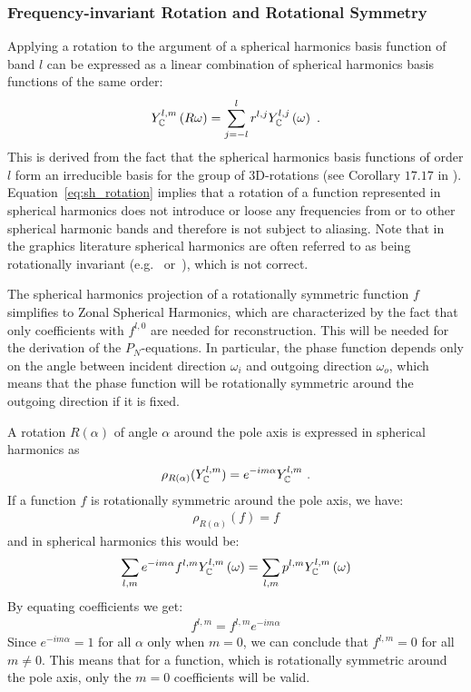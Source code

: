 \subsubsection*{Frequency-invariant Rotation and Rotational Symmetry}

Applying a rotation to the argument of a spherical harmonics basis function of band $l$ can be expressed as a linear combination of spherical harmonics basis functions of the same order:
\begin{align}
\label{eq:sh_rotation}
Y_{\mathbb{C}}^{l,m}\left(R\omega\right)=\sum_{j=-l}^{l}r^{l,j}Y_{\mathbb{C}}^{l,j}\left(\omega\right)
\ .
\end{align}
This is derived from the fact that the spherical harmonics basis functions of order $l$ form an irreducible basis for the group of 3D-rotations (see Corollary $17.17$ in \cite{Hall13}). Equation~\ref{eq:sh_rotation} implies that a rotation of a function represented in spherical harmonics does not introduce or loose any frequencies from or to other spherical harmonic bands and therefore is not subject to aliasing. Note that in the graphics literature spherical harmonics are often referred to as being rotationally invariant (e.g.~\cite{Wojciech08} or~\cite{Green03}), which is not correct.

The spherical harmonics projection of a rotationally symmetric function $f$ simplifies to Zonal Spherical Harmonics, which are characterized by the fact that only coefficients with $f^{l,0}$ are needed for reconstruction. This will be needed for the derivation of the $P_N$-equations. In particular, the phase function depends only on the angle between incident direction $\omega_i$ and outgoing direction $\omega_o$, which means that the phase function will be rotationally symmetric around the outgoing direction if it is fixed. 

A rotation $R(\alpha)$ of angle $\alpha$ around the pole axis is expressed in spherical harmonics as
\begin{align*}
\rho_{R(\alpha)}(Y_{\mathbb{C}}^{l,m}) = e^{-i m\alpha}Y_{\mathbb{C}}^{l,m}
\ .
\end{align*}
If a function $f$ is rotationally symmetric around the pole axis, we have:
\begin{align*}
\rho_{R(\alpha)}(f) = f
\end{align*}
and in spherical harmonics this would be:
\begin{align*}
\sum_{l,m}
{
e^{-i m\alpha}
f^{l,m}
Y_{\mathbb{C}}^{l,m} }\left(\omega\right)
=
\sum_{l,m}
{
p^{l,m}
Y_{\mathbb{C}}^{l,m}\left(\omega\right)
}
\end{align*}
By equating coefficients we get:
\begin{align*}
f^{l,m} = f^{l,m}e^{-i m\alpha}
\end{align*}
Since $e^{-i m\alpha}=1$ for all $\alpha$ only when $m=0$, we can conclude that $f^{l,m} = 0$ for all $m\ne0$. This means that for a function, which is rotationally symmetric around the pole axis, only the $m=0$ coefficients will be valid.

